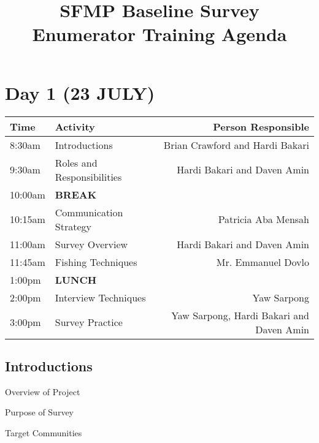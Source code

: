 \documentclass[a4paper,agenda,11pt]{meetingmins}
\begin{document}
\title{SFMP Baseline Survey Enumerator Training Agenda}

\maketitle

\section{Day 1 (23 JULY)}


\begin{tabularx}{\textwidth}{| l | X | r |} \hline
Time & Activity & Person Responsible \\ \hline \hline
8:30am &
Introductions &
Brian Crawford and Hardi Bakari \\ \hline

9:30am &
Roles and Responsibilities &
Hardi Bakari and Daven Amin \\ \hline

10:00am &
\textbf{BREAK} &
 \\ \hline

10:15am & 
Communication Strategy &
Patricia Aba Mensah \\ \hline

11:00am & 
Survey Overview &
Hardi Bakari and Daven Amin \\ \hline

11:45am & 
Fishing Techniques &
Mr. Emmanuel Dovlo \\ \hline

1:00pm & 
\textbf{LUNCH} &
 \\ \hline

2:00pm &
Interview Techniques &
Yaw Sarpong \\ \hline

3:00pm  & 
Survey Practice & 
Yaw Sarpong, Hardi Bakari and Daven Amin \\ \hline

\end{tabularx}

\subsection{Introductions}
\begin{subitems}
\item Overview of Project
\item Purpose of Survey
\item Target Communities
\end{subitems}
\end{document}
